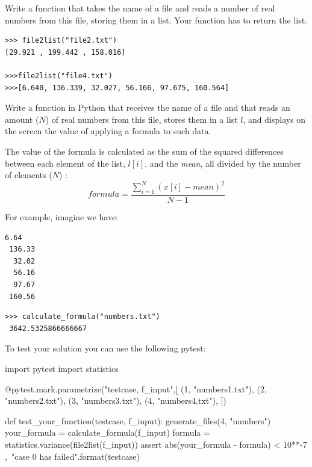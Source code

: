 \begin{exercise}
Write a function  that takes the name of a file and reads a number of real numbers from this file, storing them in a list. Your function has to return the list. 


\begin{Verbatim}[frame=single, label={\em interactive session example}]
>>> file2list("file2.txt")
[29.921 , 199.442 , 158.016]

>>>file2list("file4.txt")
>>>[6.640, 136.339, 32.027, 56.166, 97.675, 160.564]
\end{Verbatim}

\end{exercise}

\begin{exercise}
Write a function  in Python that receives the name of a file and that reads an amount ($N$) of real numbers from this file, stores them in a list $l$, and displays on the screen the value of applying a formula to such data.

The value of the formula is calculated as the sum of the squared differences between each element of the list, $l[i]$, and the \emph{mean}, all divided by the number of elements ($N$) :
\begin{equation}
  formula = \frac{\sum_{i=1}^{N} (x[i]-mean)^{2}}{N-1}
\end{equation}


For example, imagine we have:

\begin{Verbatim}[frame=single, label={\em numbers.txt}]
   6.64 
 136.33 
  32.02 
  56.16 
  97.67 
 160.56 
\end{Verbatim}


\begin{Verbatim}[frame=single, label={\em function call example}]
>>> calculate_formula("numbers.txt")
 3642.5325866666667
\end{Verbatim}

To test your solution you can use the following pytest:

\begin{python}
import pytest
import statistics

@pytest.mark.parametrize("testcase, f_input",[
(1,  "numbers1.txt"),
(2,  "numbers2.txt"),
(3,  "numbers3.txt"),
(4,  "numbers4.txt"),
])

def test_your_function(testcase, f_input):
    generate_files(4, "numbers")
    your_formula = calculate_formula(f_input)
    formula = statistics.variance(file2list(f_input))
    assert abs(your_formula - formula) < 10**-7 ,\
           "case {0} has failed".format(testcase)
\end{python}




\end{exercise}




